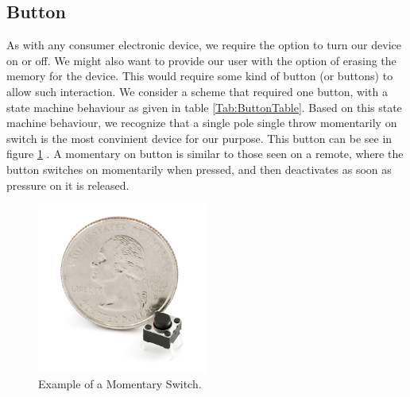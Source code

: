 \subsection{Button}
\label{Sec:Button}
As with any consumer electronic device, we require the option to turn our device on or off. We might also want to provide our user with the option of erasing the memory for the device. This would require some kind of button (or buttons) to allow such interaction. We consider a scheme that required one button, with a state machine behaviour as given in table \ref{Tab:ButtonTable}. Based on this state machine behaviour, we recognize that a single pole single throw momentarily on switch is the most convinient device for our purpose. This button can be see in figure \ref{Fig:MomButton} \cite{Web:SFEMOM}.
A momentary on button is similar to those seen on a remote, where the button switches on momentarily when pressed, and then deactivates as soon as pressure on it is released.
\begin{figure}
\begin{center}
\includegraphics[width=0.5\textwidth]{images/MOMButton.jpg}
\caption{Example of a Momentary Switch.}
\label{Fig:MomButton}
\end{center}
\end{figure}


